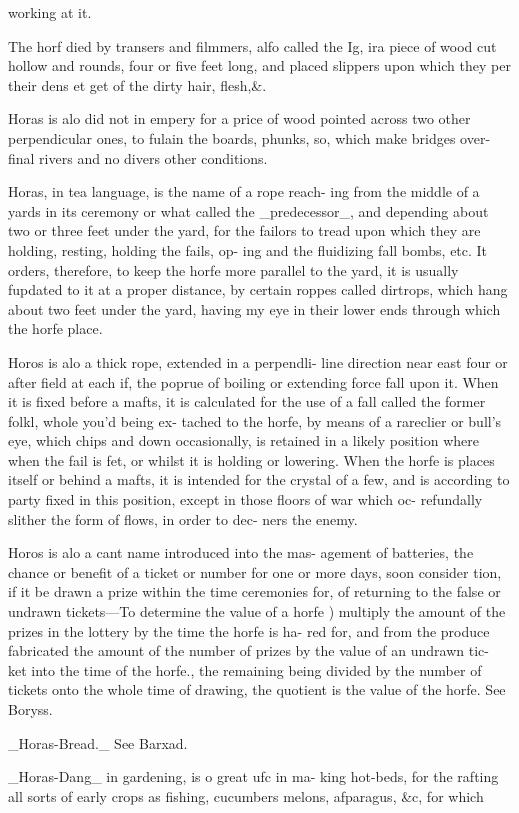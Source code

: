 working at it.\par\medskip
The horf died by transers and filmmers, alfo called
the Ig, ira piece of wood cut hollow and rounds,
four or five feet long, and placed slippers upon which
they per their dens et get of the dirty hair, flesh,\&.\par\medskip
Horas is alo did not in empery for a price of wood
pointed across two other perpendicular ones, to fulain
the boards, phunks, so, which make bridges over-final
rivers and no divers other conditions.\par\medskip
Horas, in tea language, is the name of a rope reach-
ing from the middle of a yards in its ceremony or what
called the \_predecessor\_, and depending about two or
three feet under the yard, for the failors to tread upon
which they are holding, resting, holding the fails, op-
ing and the fluidizing fall bombs, etc. It orders, therefore, to keep the horfe more parallel to the yard, it is
usually fupdated to it at a proper distance, by certain
roppes called dirtrops, which hang about two feet under
the yard, having my eye in their lower ends through
which the horfe place.\par\medskip
Horos is alo a thick rope, extended in a perpendli-
line direction near east four or after field at each if,
the poprue of boiling or extending force fall upon it.
When it is fixed before a mafts, it is calculated for the
use of a fall called the former folkl, whole you'd being ex-
tached to the horfe, by means of a rareclier or bull's
eye, which chips and down occasionally, is retained
in a likely position where when the fail is fet, or
whilst it is holding or lowering. When the horfe is
places itself or behind a mafts, it is intended for the
crystal of a few, and is according to party fixed
in this position, except in those floors of war which oc-
refundally slither the form of flows, in order to dec-
ners the enemy.\par\medskip
Horos is alo a cant name introduced into the mas-
agement of batteries, the chance or benefit of a
ticket or number for one or more days, soon consider
tion, if it be drawn a prize within the time ceremonies
for, of returning to the false or undrawn tickets—To
determine the value of a horfe ) multiply the amount
of the prizes in the lottery by the time the horfe is ha-
red for, and from the produce fabricated the amount of
the number of prizes by the value of an undrawn tic-
ket into the time of the horfe., the remaining being
divided by the number of tickets onto the whole time of
drawing, the quotient is the value of the horfe. See
Boryss.\par\medskip
\_Horas-Bread.\_ See Barxad.\par\medskip
\_Horas-Dang\_ in gardening, is o great ufc in ma-
king hot-beds, for the rafting all sorts of early crops
as fishing, cucumbers melons, afparagus, \&c, for
which\par\medskip

